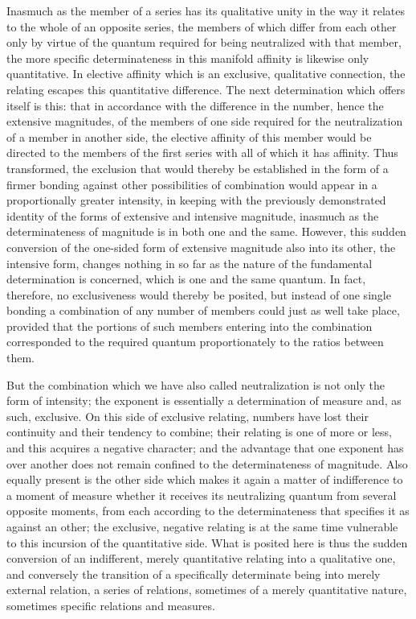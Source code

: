 Inasmuch as the member of a series has its qualitative unity
in the way it relates to the whole of an opposite series,
the members of which differ from each other only by virtue of
the quantum required for being neutralized with that member,
the more specific determinateness in this manifold affinity
is likewise only quantitative.
In elective affinity which is an exclusive, qualitative connection,
the relating escapes this quantitative difference.
The next determination which offers itself is this:
that in accordance with the difference in the number,
hence the extensive magnitudes,
of the members of one side required
for the neutralization of a member in another side,
the elective affinity of this member would be directed
to the members of the first series with all of which it has affinity.
Thus transformed, the exclusion that would thereby be established
in the form of a firmer bonding against other possibilities of combination
would appear in a proportionally greater intensity,
in keeping with the previously demonstrated identity
of the forms of extensive and intensive magnitude,
inasmuch as the determinateness of magnitude is in both one and the same.
However, this sudden conversion of the one-sided form
of extensive magnitude also into its other,
the intensive form, changes nothing in so far as
the nature of the fundamental determination is concerned,
which is one and the same quantum.
In fact, therefore, no exclusiveness would thereby be posited,
but instead of one single bonding
a combination of any number of members
could just as well take place,
provided that the portions of such members
entering into the combination corresponded to
the required quantum proportionately
to the ratios between them.

But the combination which we have also called neutralization
is not only the form of intensity;
the exponent is essentially a determination of measure
and, as such, exclusive.
On this side of exclusive relating,
numbers have lost their continuity
and their tendency to combine;
their relating is one of more or less,
and this acquires a negative character;
and the advantage that one exponent has over another
does not remain confined to the determinateness of magnitude.
Also equally present is the other side
which makes it again a matter of indifference
to a moment of measure whether it receives its
neutralizing quantum from several opposite moments,
from each according to the determinateness
that specifies it as against an other;
the exclusive, negative relating is at the same time
vulnerable to this incursion of the quantitative side.
What is posited here is thus the sudden conversion of an indifferent,
merely quantitative relating into a qualitative one,
and conversely the transition of a specifically determinate being
into merely external relation,
a series of relations, sometimes of a merely quantitative nature,
sometimes specific relations and measures.

